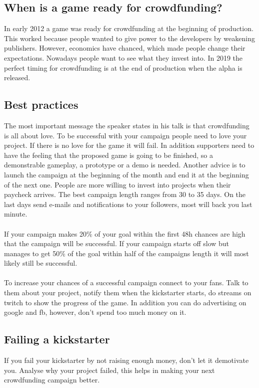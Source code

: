 \documentclass[a4paper]{article}
\begin{document}
\subsection{When is a game ready for crowdfunding?}
In early 2012 a game was ready for crowdfunding at the beginning of production. This worked because people wanted to give power to the developers by weakening publishers. However, economics have chanced, which made people change their expectations. Nowadays people want to see what they invest into. In 2019 the perfect timing for crowdfunding is at the end of production when the alpha is released.

\subsection{Best practices}
The most important message the speaker states in his talk is that crowdfunding is all about love. To be successful with your campaign people need to love your project. If there is no love for the game it will fail. In addition supporters need to have the feeling that the proposed game is going to be finished, so a demonstrable gameplay, a prototype or a demo is needed. Another advice is to launch the campaign at the beginning of the month and end it at the beginning of the next one. People are more willing to invest into projects when their paycheck arrives. The best campaign length ranges from 30 to 35 days. On the last days send e-mails and notifications to your followers, most will back you last minute.\\\\
If your campaign makes 20\% of your goal within the first 48h chances are high that the campaign will be successful. If your campaign starts off slow but manages to get 50\% of the goal within half of the campaigns length it will most likely still be successful.\\\\
To increase your chances of a successful campaign connect to your fans. Talk to them about your project, notify them when the kickstarter starts, do streams on twitch to show the progress of the game. In addition you can do advertising on google and fb, however, don't spend too much money on it.

\subsection{Failing a kickstarter}
If you fail your kickstarter by not raising enough money, don't let it demotivate you. Analyse why your project failed, this helps in making your next crowdfunding campaign better.
\end{document}
